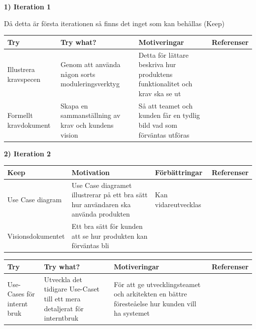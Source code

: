 \documentclass[conference,a4paper]{IEEEtran}
\newcommand\Tstrut{\rule{0pt}{2.6ex}}       %
\newcommand\Bstrut{\rule[-0.9ex]{0pt}{0pt}} %
\newcommand{\TBstrut}{\Tstrut\Bstrut} %
\begin{document}
\textbf{1) Iteration 1}

Då detta är första iterationen så finns det inget som kan behållas (Keep)

\begin{table}[H]
	\small
  \centering
	\begin{tabular}{|p{1.5cm}|p{2cm}|p{1.8cm}|p{1.5cm}|} %
    \hline
    Try & Try what? & Motiveringar & Referenser \TBstrut \\
    \hline
     Illustrera kravspecen & Genom att använda någon sorts moduleringsverktyg & Detta för lättare beskriva hur produktens funktionalitet och krav ska se ut  & \TBstrut \\
    \hline
     Formellt kravdokument & Skapa en sammanställning av krav och kundens vision & Så att teamet och kunden får en tydlig bild vad som förväntas utföras  & \TBstrut \\
    \hline 
  \end{tabular}
\end{table}

\textbf{2) Iteration 2}

\begin{table}[H]
	\small
  \centering
	\begin{tabular}{|p{1.5cm}|p{2cm}|p{1.8cm}|p{1.5cm}|} %
    \hline
    Keep & Motivation & Förbättringar & Referenser \TBstrut \\
    \hline
   Use Case diagram & Use Case diagramet illustrerar på ett bra sätt hur användaren ska använda produkten & Kan vidareutvecklas & \cite{Jacobson11} \TBstrut \\
    \hline
    Visionsdokumentet & Ett bra sätt för kunden att se hur produkten kan förväntas bli &  & \cite{Sommerville10} \TBstrut \\
    \hline
  \end{tabular}
\end{table}

\begin{table}[H]
	\small
  \centering
	\begin{tabular}{|p{1.5cm}|p{2cm}|p{1.8cm}|p{1.5cm}|} %
    \hline
    Try & Try what? & Motiveringar & Referenser \TBstrut \\
    \hline
    Use-Cases för internt bruk & Utveckla det tidigare Use-Caset till ett mera detaljerat för interntbruk & För att ge utvecklingsteamet och arkitekten en bättre föresteåelse hur kunden vill ha systemet & \TBstrut \\
    \hline
  \end{tabular}
\end{table}
\end{document}
